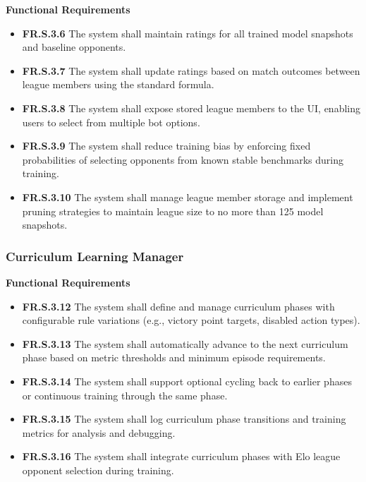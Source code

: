 \documentclass{article}
\begin{document}
\textbf{Functional Requirements}

\begin{itemize}
  \item \label{FR.S.3.6}\textbf{FR.S.3.6} The system shall maintain \Elo{} ratings for all trained model snapshots and baseline opponents.
  \item \label{FR.S.3.7}\textbf{FR.S.3.7} The system shall update \Elo{} ratings based on match outcomes between league members using the standard \Elo{} formula.
  \item \label{FR.S.3.8}\textbf{FR.S.3.8} The system shall expose stored league members to the UI, enabling users to select from multiple bot options.
  \item \label{FR.S.3.9}\textbf{FR.S.3.9} The system shall reduce training bias by enforcing fixed probabilities of selecting opponents from known stable benchmarks during training.
  \item \label{FR.S.3.10}\textbf{FR.S.3.10} The system shall manage league member storage and implement pruning strategies to maintain league size to no more than 125 model snapshots.
\end{itemize}

\subsubsection{Curriculum Learning Manager}

\textbf{Functional Requirements}

\begin{itemize}
  \item \label{FR.S.3.12}\textbf{FR.S.3.12} The system shall define and manage curriculum phases with configurable rule variations (e.g., victory point targets, disabled action types).
  \item \label{FR.S.3.13}\textbf{FR.S.3.13} The system shall automatically advance to the next curriculum phase based on metric thresholds and minimum episode requirements.
  \item \label{FR.S.3.14}\textbf{FR.S.3.14} The system shall support optional cycling back to earlier phases or continuous training through the same phase.
  \item \label{FR.S.3.15}\textbf{FR.S.3.15} The system shall log curriculum phase transitions and training metrics for analysis and debugging.
  \item \label{FR.S.3.16}\textbf{FR.S.3.16} The system shall integrate curriculum phases with Elo league opponent selection during training.
\end{itemize}
\end{document}
